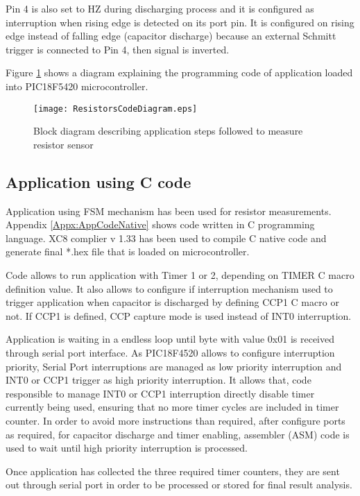Pin 4 is also set to HZ during discharging process and it is configured as interruption when rising edge is detected on its port pin. It is configured on rising edge instead of falling edge (capacitor discharge) because an external Schmitt trigger is connected to Pin 4, then signal is inverted.
\medskip

Figure \ref{fig:ResistorsCodeDiagram} shows a diagram explaining the programming code of application loaded into PIC18F5420 microcontroller.
\medskip

\begin{figure}[!ht]
\centering
\texttt{[image: ResistorsCodeDiagram.eps]}
\caption{Block diagram describing application steps followed to measure resistor sensor}
\label{fig:ResistorsCodeDiagram}
\end{figure}

\subsection{Application using C code}\label{SS:Res:Code:Native}
Application using FSM mechanism has been used for resistor measurements. Appendix \ref{Appx:AppCodeNative} shows code written in C programming language. XC8 complier v 1.33 has been used to compile C native code and generate final *.hex file that is loaded on microcontroller.

Code allows to run application with Timer 1 or 2, depending on TIMER C macro definition value. It also allows to configure if interruption mechanism used to trigger application when capacitor is discharged by defining CCP1 C macro or not. If CCP1 is defined, CCP capture mode is used instead of INT0 interruption.

Application is waiting in a endless loop until byte with value 0x01 is received through serial port interface. As PIC18F4520 allows to configure interruption priority, Serial Port interruptions are managed as low priority interruption and INT0 or CCP1 trigger as high priority interruption. It allows that, code responsible to manage INT0 or CCP1 interruption directly disable timer currently being used, ensuring that no more timer cycles are included in timer counter. In order to avoid more instructions than required, after configure ports as required, for capacitor discharge and timer enabling, assembler (ASM) code is used to wait until high priority interruption is processed.

Once application has collected the three required timer counters, they are sent out through serial port in order to be processed or stored for final result analysis.

